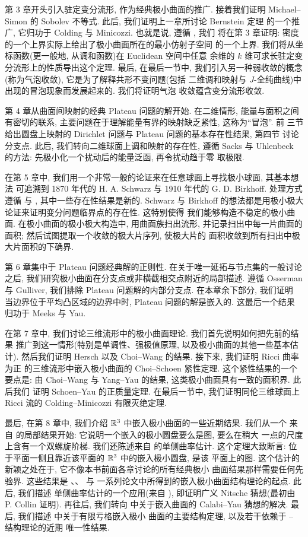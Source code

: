 第 3 章开头引入驻定变分流形, 作为经典极小曲面的推广. 接着我们证明
Michael--Simon 的 Sobolev 不等式. 此后, 我们证明上一章所讨论 Bernstein 定理
的一个推广, 它归功于 Colding 与 Minicozzi. 也就是说, 遵循 \cite{CM6}, 我们
将在第 3 章证明: 密度的一个上界实际上给出了极小曲面所在的最小仿射子空间
的一个上界. 我们将从坐标函数(更一般地, 从调和函数)在 Euclidean 空间中任意
余维的 $k$ 维可求长驻定变分流形上的性质导出这个定理. 最后, 在最后一节中,
我们引入另一种弱收敛的概念(称为气泡收敛), 它是为了解释共形不变问题(包括
二维调和映射与 $J$-全纯曲线)中出现的冒泡现象而发展起来的. 我们将证明气泡
收敛蕴含变分流形收敛.

第 4 章从曲面间映射的经典 Plateau 问题的解开始. 在二维情形, 能量与面积之间
有密切的联系, 主要问题在于理解能量有界的映射缺乏紧性, 这称为``冒泡''. 前
三节给出圆盘上映射的 Dirichlet 问题与 Plateau 问题的基本存在性结果, 第四节
讨论分支点. 此后, 我们转向二维球面上调和映射的存在性, 遵循 Sacks 与
Uhlenbeck \cite{SaUh} 的方法: 先极小化一个扰动后的能量泛函, 再令扰动趋于零
取极限.

在第 5 章中, 我们用一个非常一般的论证来在任意球面上寻找极小球面, 其基本想法
可追溯到 1870 年代的 H. A. Schwarz 与 1910 年代的 G. D. Birkhoff. 处理方式
遵循 \cite{CM27} 与 \cite{CM28}, 其中一些存在性结果是新的. Schwarz 与
Birkhoff 的想法都是用极小极大论证来证明变分问题临界点的存在性. 这特别使得
我们能够构造不稳定的极小曲面. 在极小曲面的极小极大构造中, 用曲面族扫出流形,
并记录扫出中每一片曲面的面积; 然后试图提取一个收敛的极大片序列, 使极大片的
面积收敛到所有扫出中极大片面积的下确界.

第 6 章集中于 Plateau 问题经典解的正则性. 在关于唯一延拓与节点集的一般讨论
之后, 我们研究极小曲面在分支点或非横截相交点附近的局部描述. 遵循 Osserman
与 Gulliver, 我们排除 Plateau 问题解的内部分支点. 在本章余下部分, 我们证明
当边界位于平均凸区域的边界中时, Plateau 问题的解是嵌入的. 这最后一个结果
归功于 Meeks 与 Yau.

在第 7 章中, 我们讨论三维流形中的极小曲面理论. 我们首先说明如何把先前的结果
推广到这一情形(特别是单调性、强极值原理, 以及极小曲面的其他一些基本估计).
然后我们证明 Hersch 以及 Choi--Wang 的结果. 接下来, 我们证明 Ricci 曲率为正
的三维流形中嵌入极小曲面的 Choi--Schoen 紧性定理. 这个紧性结果的一个要点是:
由 Choi--Wang 与 Yang--Yau 的结果, 这类极小曲面具有一致的面积界. 此后我们
证明 Schoen--Yau 的正质量定理. 在最后一节中, 我们证明同伦三维球面上 Ricci
流的 Colding--Minicozzi 有限灭绝定理.

最后, 在第 8 章中, 我们介绍 $\mathbb{R}^3$ 中嵌入极小曲面的一些近期结果. 我们从一个
来自 \cite{CM4} 的局部结果开始: 它说明一个嵌入的极小圆盘要么是图, 要么在稍大
一点的尺度上含有一个双螺旋阶梯. 我们还陈述来自 \cite{CM6} 的单侧曲率估计.
这个定理大致断言: 位于平面一侧且靠近该平面的 $\mathbb{R}^3$ 中的嵌入极小圆盘, 是该
平面上的图. 这个估计的新颖之处在于, 它不像本书前面各章讨论的所有经典极小
曲面结果那样需要任何先验界. 这些结果是 \cite{CM3}、\cite{CM4}、\cite{CM5} 与
\cite{CM6} 一系列论文中所得到的嵌入极小曲面结构理论的起点. 此后, 我们描述
单侧曲率估计的一个应用(来自 \cite{CM10}), 即证明广义 Nitsche 猜想(最初由
P. Collin \cite{Co} 证明). 再往后, 我们转向 \cite{CM24} 中关于嵌入曲面的
Calabi--Yau 猜想的解决. 最后, 我们描述 \cite{CM7} 中关于有限亏格嵌入极小
曲面的主要结构定理, 以及若干依赖于 \cite{CM3}--\cite{CM7} 结构理论的近期
唯一性结果.

